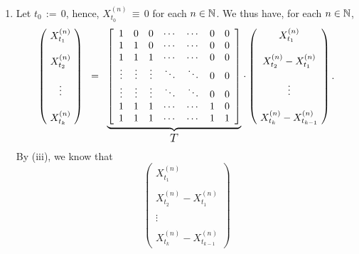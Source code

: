 \begin{enumerate}
\item	Let $t_{0} \,:= \, 0$, hence, $X^{(n)}_{t_{0}} \,\equiv\, 0$ for each $n \in \mathbb{N}$.
		We thus have, for each $n \in \mathbb{N}$,
		\begin{equation*}
		\left(\!
		\begin{array}{c}
		X^{(n)}_{t_{1}} \\ \\ X^{(n)}_{t_{2}} \\ \\ \vdots \\ \\ X^{(n)}_{t_{k}} 
		\end{array}
		\!\right)
		\;\; = \;\;
		\underset{\textnormal{\large$T$}}{\underbrace{
		\left[
		\begin{array}{ccccccc}
		1 & 0 & 0 & \cdots & \cdots & 0 & 0 \\
		1 & 1 & 0 & \cdots & \cdots & 0 & 0 \\
		1 & 1 & 1 & \cdots & \cdots & 0 & 0 \\
		\vdots & \vdots & \vdots & \ddots & \ddots & 0 & 0 \\
		\vdots & \vdots & \vdots & \ddots & \ddots & 0 & 0 \\
		1 & 1 & 1 & \cdots & \cdots & 1 & 0 \\
		1 & 1 & 1 & \cdots & \cdots & 1 & 1 \\
		\end{array}
		\right]
		}}
		\cdot
		\left(\!
		\begin{array}{c}
		X^{(n)}_{t_{1}} \\ \\ X^{(n)}_{t_{2}} - X^{(n)}_{t_{1}} \\ \\ \vdots \\ \\ X^{(n)}_{t_{k}} - X^{(n)}_{t_{k-1}}
		\end{array}
		\!\right).
		\end{equation*}
		By (iii), we know that
		\begin{equation*}
		\left(\!
		\begin{array}{c}
		X^{(n)}_{t_{1}} \\ \\ X^{(n)}_{t_{2}} - X^{(n)}_{t_{1}} \\ \\ \vdots \\ \\ X^{(n)}_{t_{k}} - X^{(n)}_{t_{k-1}}
		\end{array}
		\!\right)	

\end{equation*}
\end{enumerate}
